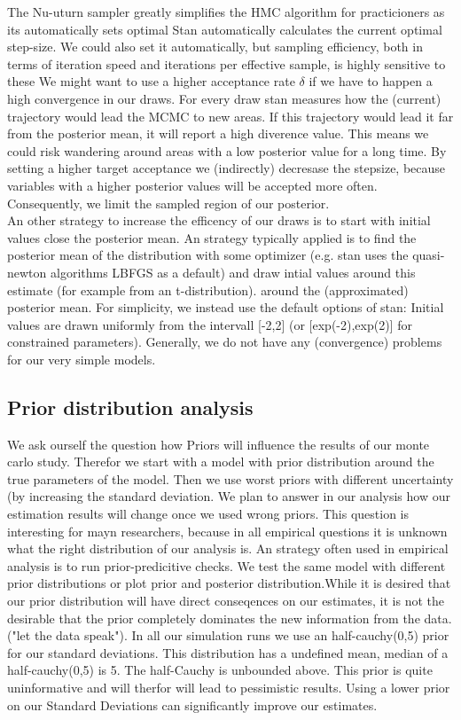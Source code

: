 \cite{stan2018}


The Nu-uturn sampler greatly simplifies the HMC algorithm for practicioners as its automatically sets optimal 
Stan automatically calculates the current optimal step-size. We could also set it automatically, but sampling efficiency, both in terms of iteration speed and iterations per effective sample, is highly sensitive to these 
We might want to use a higher acceptance rate $\delta$ if we have to happen a high convergence in our draws. For every draw stan measures how the (current) trajectory would lead the MCMC to new areas. If this trajectory would lead it far from the posterior mean, it will report a high diverence value. This means we could risk wandering around areas with a low posterior value for a long time. By setting a higher target acceptance we (indirectly) decresase the stepsize, because variables with a higher posterior values will be accepted more often. Consequently, we limit the sampled region of our posterior.\\
An other strategy to increase the efficency of our draws is to start with initial values close the posterior mean.
An strategy typically applied is to find the posterior mean of the distribution with some optimizer (e.g. stan uses the quasi-newton algorithms LBFGS as a default) and draw intial values around this estimate (for example from an t-distribution).
\cite{brooks1998} around the (approximated) posterior mean. For simplicity, we instead use the default options of stan: Initial values are drawn uniformly from the intervall [-2,2] (or [exp(-2),exp(2)] for constrained parameters). Generally, we do not have any (convergence) problems for our very simple models.

\subsection{Prior distribution analysis}

We ask ourself the question how Priors will influence the results of our monte carlo study. 
Therefor we start with a model with prior distribution around the true parameters of the model. Then we use worst priors with different uncertainty (by increasing the standard deviation. We plan to answer in our analysis how our estimation results will change once we used wrong priors. This question is interesting for mayn researchers, because in all empirical questions it is unknown what the right distribution of our analysis is. An strategy often used in empirical analysis is to run prior-predicitive checks. We test the same model with different prior distributions or plot prior and posterior distribution.While it is desired that our prior distribution will have direct conseqences on our estimates, it is not the desirable that the prior completely dominates the new information from the data. ("let the data speak").
In all our simulation runs we use an half-cauchy(0,5) prior for our standard deviations. This distribution has a undefined mean, median of a half-cauchy(0,5) is 5. The half-Cauchy is unbounded above. This prior is quite uninformative and will therfor will lead to pessimistic results. Using a lower prior on our Standard Deviations can significantly improve our estimates.

